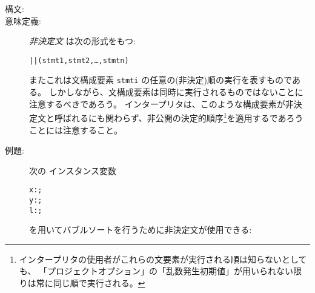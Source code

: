 \documentclass[\pformat,12pt]{jarticle}
\begin{document}
\begin{description}
\item[構文:]
  

\item[意味定義:]  {\it 非決定文} は次の形式をもつ:
  \begin{alltt}
    || (stmt1, stmt2, \ldots, stmtn)
  \end{alltt}
またこれは文構成要素 {\tt  stmti} の任意の(非決定)順の実行を表すものである。
しかしながら、文構成要素は同時に実行されるものではないことに注意するべきであろう。
インタープリタは、このような構成要素が非決定文と呼ばれるにも関わらず、非公開の決定的順序\footnote{インタープリタの使用者がこれらの文要素が実行される順は知らないとしても、 「プロジェクトオプション」の「乱数発生初期値」が用いられない限りは常に同じ順で実行される。}を適用するであろうことには注意すること。

\item[例題:] 次の
インスタンス変数
  \begin{alltt}
    x:;
    y:;
    l:;
  \end{alltt}
を用いてバブルソートを行うために非決定文が使用できる:


\end{description}
\end{document}
